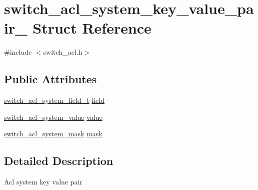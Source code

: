 \hypertarget{structswitch__acl__system__key__value__pair__}{\section{switch\+\_\+acl\+\_\+system\+\_\+key\+\_\+value\+\_\+pair\+\_\+ Struct Reference}
\label{structswitch__acl__system__key__value__pair__}
}


{\ttfamily \#include $<$switch\+\_\+acl.\+h$>$}

\subsection*{Public Attributes}
\begin{DoxyCompactItemize}
\item 
\hyperlink{group__ACL_gab50eaa35e57e14e7b50bbcb2c43c4012}{switch\+\_\+acl\+\_\+system\+\_\+field\+\_\+t} \hyperlink{structswitch__acl__system__key__value__pair___a981ae5882d30f4b352a566291cb433b5}{field}
\item 
\hyperlink{group__ACL_gaee5058c582d2ac1022152bef17c061ea}{switch\+\_\+acl\+\_\+system\+\_\+value} \hyperlink{structswitch__acl__system__key__value__pair___aaee19313f403c714e6d42a32554888d7}{value}
\item 
\hyperlink{group__ACL_ga2477a68d4720b67cc14276c172e2a018}{switch\+\_\+acl\+\_\+system\+\_\+mask} \hyperlink{structswitch__acl__system__key__value__pair___ac9e8576a7376ea7889935df70116893d}{mask}
\end{DoxyCompactItemize}


\subsection{Detailed Description}
Acl system key value pair 

